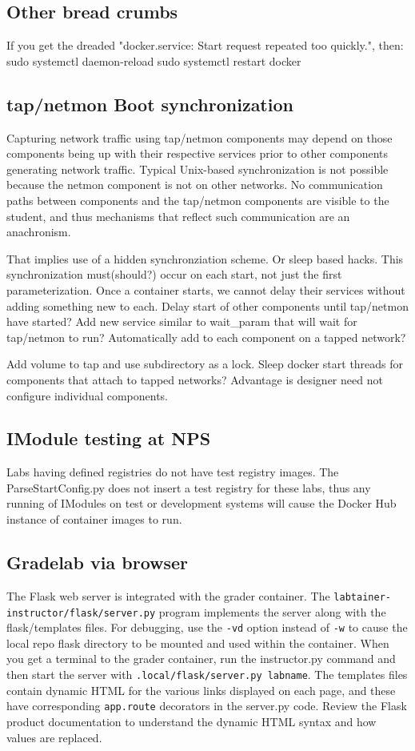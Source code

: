 \documentclass[12pt]{article}
\begin{document}
\subsection{Other bread crumbs}
If you get the dreaded "docker.service: Start request repeated too quickly.", then:
sudo systemctl daemon-reload
sudo systemctl restart docker

\subsection{tap/netmon Boot synchronization}
Capturing network traffic using tap/netmon components may depend on those components being up with their respective
services prior to other components generating network traffic.  Typical Unix-based synchronization is not possible
because the netmon component is not on other networks.  No communication paths between components and the tap/netmon
components are visible to the student, and thus mechanisms that reflect such communication are an anachronism.

That implies use of a hidden synchronziation scheme.  Or sleep based hacks.  This synchronization must(should?) occur on 
each start, not just the first parameterization.  Once a container starts, we cannot delay their services without adding
something new to each.
Delay start of other components until tap/netmon have started?
Add new service similar to wait\_param that will wait for tap/netmon to run?  Automatically add to each component
on a tapped network?

Add volume to tap and use subdirectory as a lock.  Sleep docker start threads for components that attach to
tapped networks?  Advantage is designer need not configure individual components.  

\subsection{IModule testing at NPS}
Labs having defined registries do not have test registry images.  The ParseStartConfig.py does not insert a test registry
for these labs, thus any running of IModules on test or development systems will cause the Docker Hub instance of container
images to run.

\subsection{Gradelab via browser}
The Flask web server is integrated with the grader container.  The {\tt labtainer-instructor/flask/server.py} program implements
the server along with the flask/templates files.  For debugging, use the {\tt -vd} option instead of {\tt -w} to cause the local repo
flask directory to be mounted and used within the container.  When you get a terminal to the grader container, run the instructor.py command
and then start the server with {\tt .local/flask/server.py labname}.  The templates files contain dynamic HTML for the various links displayed
on each page, and these have corresponding {\tt app.route} decorators in the server.py code.  Review the Flask product documentation to understand the dynamic HTML syntax and how values are replaced.
\end{document}
